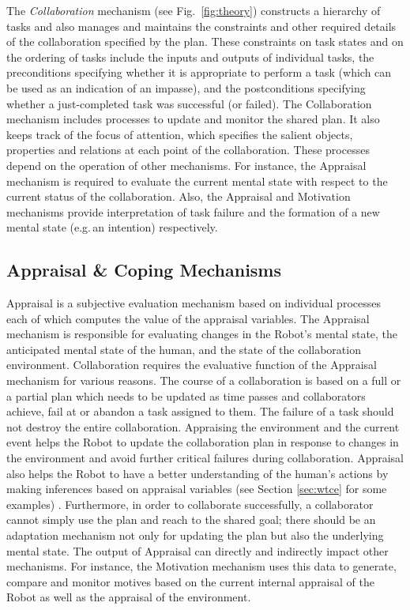 The \textit{Collaboration} mechanism (see Fig.~\ref{fig:theory}) constructs
a hierarchy of tasks and also manages and maintains the constraints and other
required details of the collaboration specified by the plan. These constraints
on task states and on the ordering of tasks include the inputs and outputs of
individual tasks, the preconditions specifying whether it is appropriate to
perform a task (which can be used as an indication of an impasse), and the
postconditions specifying whether a just-completed task was successful (or
failed). The Collaboration mechanism includes processes to update and monitor
the shared plan. It also keeps track of the focus of attention, which specifies
the salient objects, properties and relations at each point of the
collaboration. These processes depend on the operation of other mechanisms. For
instance, the Appraisal mechanism is required to evaluate the current mental
state with respect to the current status of the collaboration. Also, the
Appraisal and Motivation mechanisms provide interpretation of task failure and
the formation of a new mental state (e.g.\,an intention) respectively.

\subsection{Appraisal \& Coping Mechanisms}
\label{sec:appraisal-coping-mech}

Appraisal is a subjective evaluation mechanism based on individual processes
each of which computes the value of the appraisal variables. The Appraisal
mechanism is responsible for evaluating changes in the Robot's mental state, the
anticipated mental state of the human, and the state of the collaboration
environment. Collaboration requires the evaluative function of the Appraisal
mechanism for various reasons. The course of a collaboration is based on a full
or a partial plan \cite{grosz:collaboration,grosz:discourse-structure} which
needs to be updated as time passes and collaborators achieve, fail at or abandon
a task assigned to them. The failure of a task should not destroy the entire
collaboration. Appraising the environment and the current event helps the Robot
to update the collaboration plan in response to changes in the environment and
avoid further critical failures during collaboration. Appraisal also helps the
Robot to have a better understanding of the human's actions by making inferences
based on appraisal variables (see Section \ref{sec:wtce} for some examples)
\cite{marsella:ema-process-model} \cite{scherer:appraisal-processes}.
Furthermore, in order to collaborate successfully, a collaborator cannot simply
use the plan and reach to the shared goal; there should be an adaptation
mechanism not only for updating the plan but also the underlying mental state.
The output of Appraisal can directly and indirectly impact other mechanisms. For
instance, the Motivation mechanism uses this data to generate, compare and
monitor motives based on the current internal appraisal of the Robot as well as
the appraisal of the environment.


